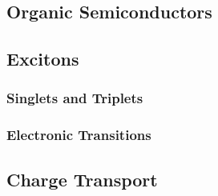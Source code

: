 \documentclass[../thesis.tex]{subfiles}
\begin{document}
\subsection{Organic Semiconductors}

\subsection{Excitons}
\subsubsection{Singlets and Triplets}
\subsubsection{Electronic Transitions}

\subsection{Charge Transport}
\end{document}
